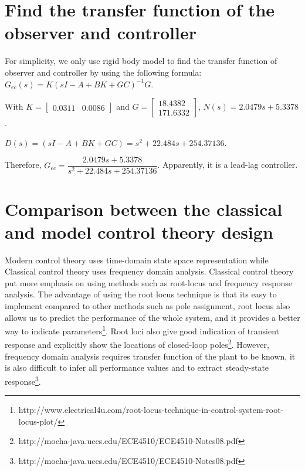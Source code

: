 \documentclass[a4paper, 12pt]{article}
\begin{document}
\newpage
\section{Find the transfer function of the observer and controller}
\hspace{2.5ex}
For simplicity, we only use rigid body model to find the transfer function of observer and controller by using the following formula: $G_{ec}(s) = K(sI  - A + BK + GC)^{-1} G$.

With $K= \begin{bmatrix} 0.0311 & 0.0086 \end{bmatrix}$ and $G = \begin{bmatrix} 18.4382 \\ 171.6332 \end{bmatrix}$, $N(s) = 2.0479s + 5.3378$.

$D(s) = (sI  - A + BK + GC) = s^2  + 22.484s + 254.37136$.

Therefore, $G_{ec} = \dfrac{2.0479s + 5.3378}{s^2  + 22.484s + 254.37136}$. Apparently, it is a lead-lag controller. 



\section{Comparison between the classical and model control theory design}
\hspace{2.5ex}
Modern control theory uses time-domain state space representation while Classical control theory uses frequency domain analysis. Classical control theory put more emphasis on using methods such as root-locus and frequency response analysis. 
The advantage of using the root locus technique is that its easy to implement compared to other methods such as pole assignment, root locus also allows us to predict the performance of the whole system, and it provides a better way to indicate parameters\footnote{http://www.electrical4u.com/root-locus-technique-in-control-system-root-locus-plot/}.  Root loci also give good indication of transient response and explicitly show the locations of closed-loop poles\footnote{http://mocha-java.uccs.edu/ECE4510/ECE4510-Notes08.pdf}. 
However, frequency domain analysis requires transfer function of the plant to be known, it is also difficult to infer all performance values and to extract steady-state response\footnote{http://mocha-java.uccs.edu/ECE4510/ECE4510-Notes08.pdf}.
\end{document}
